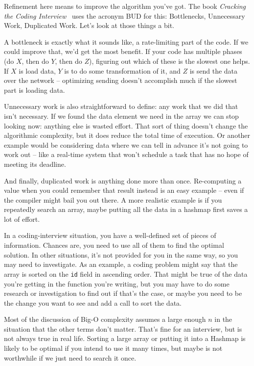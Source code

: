 Refinement here means to improve the algorithm you've got. The book \textit{Cracking the Coding Interview}~\cite{mcdowell2015cracking} uses the acronym BUD for this: Bottlenecks, Unnecessary Work, Duplicated Work. Let's look at those things a bit.

A bottleneck is exactly what it sounds like, a rate-limiting part of the code. If we could improve that, we'd get the most benefit. If your code has multiple phases (do $X$, then do $Y$, then do $Z$), figuring out which of these is the slowest one helps. If $X$ is load data, $Y$ is to do some transformation of it, and $Z$ is send the data over the network -- optimizing sending doesn't accomplish much if the slowest part is loading data. 

Unnecessary work is also straightforward to define: any work that we did that isn't necessary. If we found the data element we need in the array we can stop looking now: anything else is wasted effort. That sort of thing doesn't change the algorithmic complexity, but it does reduce the total time of execution. Or another example would be considering data where we can tell in advance it's not going to work out -- like a real-time system that won't schedule a task that has no hope of meeting its deadline.

And finally, duplicated work is anything done more than once. Re-computing a value when you could remember that result instead is an easy example -- even if the compiler might bail you out there. A more realistic example is if you repeatedly search an array, maybe putting all the data in a hashmap first saves a lot of effort. 

In a coding-interview situation, you have a well-defined set of pieces of information. Chances are, you need to use all of them to find the optimal solution. In other situations, it's not provided for you in the same way, so you may need to investigate. As an example, a coding problem might say that the array is sorted on the \texttt{id} field in ascending order. That might be true of the data you're getting in the function you're writing, but you may have to do some research or investigation to find out if that's the case, or maybe you need to be the change you want to see and add a call to sort the data.

Most of the discussion of Big-O complexity assumes a large enough $n$ in the situation that the other terms don't matter. That's fine for an interview, but is not always true in real life. Sorting a large array or putting it into a Hashmap is likely to be optimal if you intend to use it many times, but maybe is not worthwhile if we just need to search it once. 


